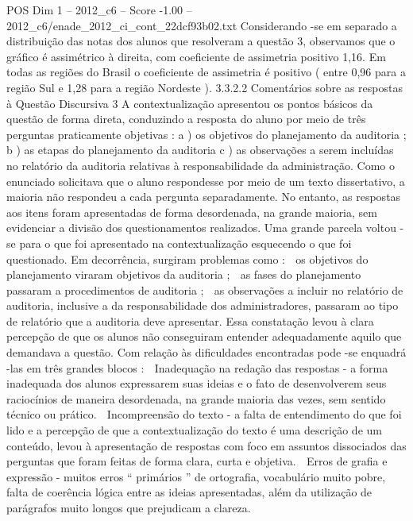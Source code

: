 \begin{textsample}{POS Dim 1 – 2012\_c6 – Score -1.00 – 2012\_c6/enade\_2012\_ci\_cont\_22dcf93b02.txt}
Considerando -se em separado a distribuição das notas dos alunos que resolveram a questão 3, observamos que o gráfico é assimétrico à direita, com coeficiente de assimetria positivo 1,16.
Em todas as regiões do Brasil o coeficiente de assimetria é positivo ( entre 0,96 para a região Sul e 1,28 para a região Nordeste ). 3.3.2.2 Comentários sobre as respostas à Questão Discursiva 3 A contextualização apresentou os pontos básicos da questão de forma direta, conduzindo a resposta do aluno por meio de três perguntas praticamente objetivas : a ) os objetivos do planejamento da auditoria ; b ) as etapas do planejamento da auditoria c ) as observações a serem incluídas no relatório da auditoria relativas à responsabilidade da administração.
Como o enunciado solicitava que o aluno respondesse por meio de um texto dissertativo, a maioria não respondeu a cada pergunta separadamente.
No entanto, as respostas aos itens foram apresentadas de forma desordenada, na grande maioria, sem evidenciar a divisão dos questionamentos realizados.
Uma grande parcela voltou -se para o que foi apresentado na contextualização esquecendo o que foi questionado.
Em decorrência, surgiram problemas como :  os objetivos do planejamento viraram objetivos da auditoria ;  as fases do planejamento passaram a procedimentos de auditoria ;  as observações a incluir no relatório de auditoria, inclusive a da responsabilidade dos administradores, passaram ao tipo de relatório que a auditoria deve apresentar.
Essa constatação levou à clara percepção de que os alunos não conseguiram entender adequadamente aquilo que demandava a questão.
Com relação às dificuldades encontradas pode -se enquadrá -las em três grandes blocos :  Inadequação na redação das respostas - a forma inadequada dos alunos expressarem suas ideias e o fato de desenvolverem seus raciocínios de maneira desordenada, na grande maioria das vezes, sem sentido técnico ou prático.  Incompreensão do texto - a falta de entendimento do que foi lido e a percepção de que a contextualização do texto é uma descrição de um conteúdo, levou à apresentação de respostas com foco em assuntos dissociados das perguntas que foram feitas de forma clara, curta e objetiva.  Erros de grafia e expressão - muitos erros “ primários ” de ortografia, vocabulário muito pobre, falta de coerência lógica entre as ideias apresentadas, além da utilização de parágrafos muito longos que prejudicam a clareza.

\end{textsample}
